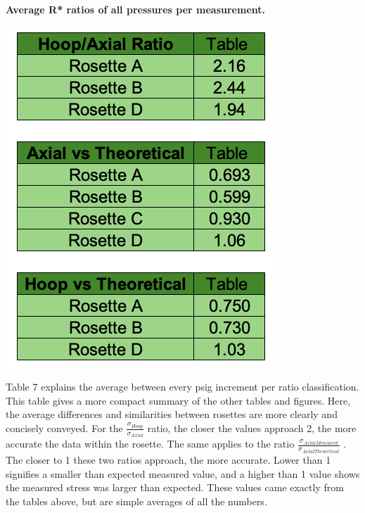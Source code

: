 \documentclass[12pt]{article}
\begin{document}
\begin{table}[H]
  \caption{\textbf{Average R* ratios of all pressures per measurement.}}
  \includegraphics[width=.65\linewidth]{table_average_diff}
  \centering
\end{table}

Table 7 explains the average between every psig increment per ratio classification. This table gives a more compact summary of the other tables and figures. Here, the average differences and similarities between rosettes are more clearly and concisely conveyed. For the $\frac{\sigma_{Hoop}}{\sigma_{Axial}}$ ratio, the closer the values approach 2, the more accurate the data within the rosette. The same applies to the ratio $\frac{\sigma_{Axial Measured}}{\sigma_{Axial Theoretical}} $ . The closer to 1 these two ratios approach, the more accurate. Lower than 1 signifies a smaller than expected measured value, and a higher than 1 value shows the measured stress was larger than expected. These values came exactly from the tables above, but are simple averages of all the numbers. 
\newpage
\end{document}
